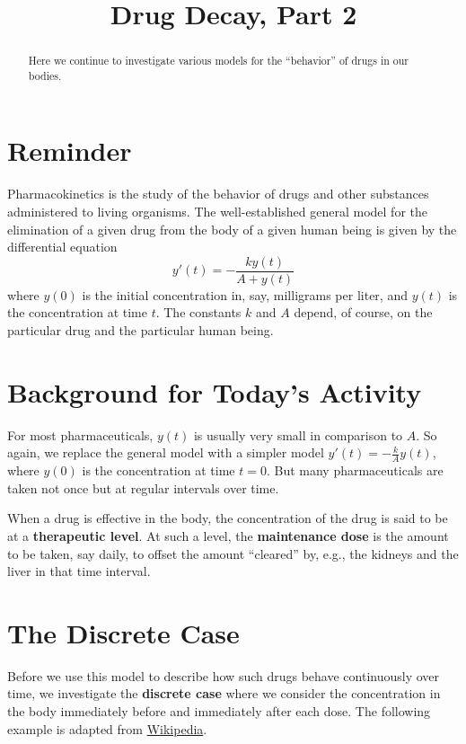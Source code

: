 \documentclass[space,handout]{ximera}
\title{Drug Decay, Part 2}
\begin{document}
\begin{abstract}
Here we continue to investigate various models for the ``behavior'' of drugs in our bodies.  
\end{abstract}
\maketitle

\section{Reminder}
Pharmacokinetics is the study of the behavior of drugs and other substances administered to living organisms.  
The well-established general model for 
the elimination of a given drug from the body of a given human being is given by the differential equation 
$$y'(t)=-\frac{ky(t)}{A+y(t)}$$
where $y(0)$ is the initial concentration in, say, milligrams per liter, and $y(t)$ is the concentration at time $t$.  The constants $k$ and $A$ depend, of course, on the particular drug and the particular human being. 


\section{Background for Today's Activity}
For most pharmaceuticals, $y(t)$ is usually very small in comparison
to $A$.  So again, we replace the general model with a simpler model
$y'(t)=-\frac{k}{A}y(t)$, where $y(0)$ is the concentration at time
$t=0$.  But many pharmaceuticals are taken not once but at regular
intervals over time.

When a drug is effective in the body, the concentration of the drug is
said to be at a \textbf{therapeutic level}.  At such a level, the
\textbf{maintenance dose} is the amount to be taken, say daily, to
offset the amount ``cleared'' by, e.g., the kidneys and the liver in
that time interval.

\section{The Discrete Case}
Before we use this model to describe how such drugs behave
continuously over time, we investigate the \textbf{discrete case}
where we consider the concentration in the body immediately before and
immediately after each dose.  The following example is adapted from
\href{http://en.wikipedia.org/wiki/Loading_dose}{Wikipedia}.
\end{document}
